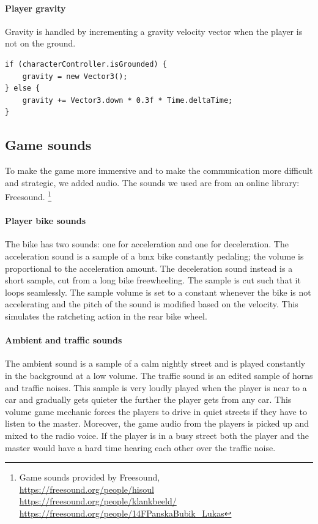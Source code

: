 \documentclass[12pt]{article}
\begin{document}
\paragraph{Player gravity}
Gravity is handled by incrementing a gravity velocity vector when the player is not on the ground.

\lstset{style=sharpc}
\begin{lstlisting}
if (characterController.isGrounded) {
    gravity = new Vector3();
} else {
    gravity += Vector3.down * 0.3f * Time.deltaTime;
}
\end{lstlisting}

\clearpage

\subsection{Game sounds}
To make the game more immersive and to make the communication more difficult and strategic, we added audio. The sounds we used are from an online library: Freesound. 
\footnote{
Game sounds provided by Freesound, \\
\url{https://freesound.org/people/hisoul} \\ 
\url{https://freesound.org/people/klankbeeld/} \\
\url{https://freesound.org/people/14FPanskaBubik_Lukas}
}
\paragraph{Player bike sounds}
The bike has two sounds: one for acceleration and one for deceleration. The acceleration sound is a sample of a bmx bike constantly pedaling; the volume is proportional to the acceleration amount. The deceleration sound instead is a short sample, cut from a long bike freewheeling. The sample is cut such that it loops seamlessly. The sample volume is set to a constant whenever the bike is not accelerating and the pitch of the sound is modified based on the velocity. This simulates the ratcheting action in the rear bike wheel.
\paragraph{Ambient and traffic sounds}
The ambient sound is a sample of a calm nightly street and is played constantly in the background at a low volume. The traffic sound is an edited sample of horns and traffic noises. This sample is very loudly played when the player is near to a car and gradually gets quieter the further the player gets from any car. This volume game mechanic forces the players to drive in quiet streets if they have to listen to the master. Moreover, the game audio from the players is picked up and mixed to the radio voice. If the player is in a busy street both the player and the master would have a hard time hearing each other over the traffic noise.
\end{document}
